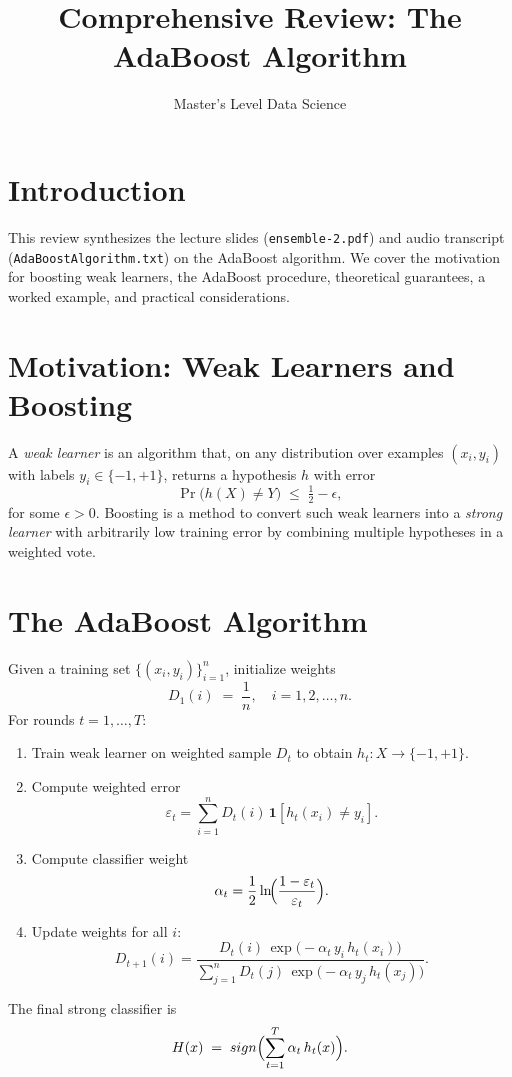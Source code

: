 \documentclass[11pt]{article}
\title{Comprehensive Review: The AdaBoost Algorithm}
\author{Master's Level Data Science}
\date{}
\begin{document}
\maketitle
\tableofcontents
\bigskip

\section{Introduction}
This review synthesizes the lecture slides (\texttt{ensemble-2.pdf}) and audio transcript (\texttt{AdaBoostAlgorithm.txt}) on the AdaBoost algorithm. We cover the motivation for boosting weak learners, the AdaBoost procedure, theoretical guarantees, a worked example, and practical considerations.

\section{Motivation: Weak Learners and Boosting}
A \emph{weak learner} is an algorithm that, on any distribution over examples $(x_i,y_i)$ with labels $y_i\in\{-1,+1\}$, returns a hypothesis $h$ with error
\[
  \Pr\bigl(h(X)\neq Y\bigr)\;\le\;\tfrac12 - \epsilon,
\]
for some $\epsilon>0$. Boosting is a method to convert such weak learners into a \emph{strong learner} with arbitrarily low training error by combining multiple hypotheses in a weighted vote.

\section{The AdaBoost Algorithm}
Given a training set $\{(x_i,y_i)\}_{i=1}^n$, initialize weights
\[
  D_1(i) \;=\;\frac1n,\quad i=1,2,\dots,n.
\]
For rounds $t=1,\dots,T$:
\begin{enumerate}
  \item Train weak learner on weighted sample $D_t$ to obtain $h_t:X\to\{-1,+1\}$.
  \item Compute weighted error
  \[
    \varepsilon_t 
    = \sum_{i=1}^n D_t(i)\,\mathbf{1}[h_t(x_i)\neq y_i].
  \]
  \item Compute classifier weight
  \[
    \alpha_t
    = \frac12\ln\!\Bigl(\frac{1-\varepsilon_t}{\varepsilon_t}\Bigr).
  \]
  \item Update weights for all $i$:
  \[
    D_{t+1}(i)
    = \frac{D_t(i)\,\exp\bigl(-\alpha_t\,y_i\,h_t(x_i)\bigr)}
           {\sum_{j=1}^n D_t(j)\,\exp\bigl(-\alpha_t\,y_j\,h_t(x_j)\bigr)}.
  \]
\end{enumerate}
The final strong classifier is
\[
  H(x) \;=\;sign\Bigl(\sum_{t=1}^T \alpha_t\,h_t(x)\Bigr).
\]
\end{document}
